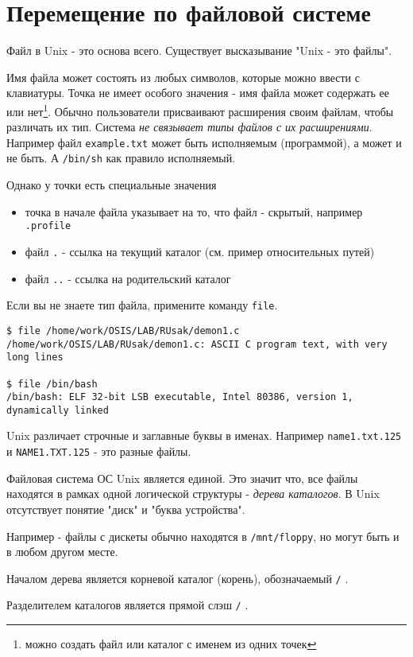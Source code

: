 \section{Перемещение по файловой системе} 


Файл в Unix - это основа всего. Существует высказывание "Unix - это файлы".

Имя файла может состоять из любых символов, которые можно ввести с клавиатуры. Точка не имеет особого значения - имя файла может содержать ее или нет\footnote{можно создать файл или каталог с именем из одних точек}. Обычно пользователи присваивают расширения своим файлам, чтобы различать их тип. Система \emph{не связывает типы файлов с их расширениями}. Например файл \verb+example.txt+ может быть исполняемым (программой), а может и не быть. А \verb+/bin/sh+ как правило исполняемый.

Однако у точки есть специальные значения 
\begin{itemize}
\item точка в начале файла указывает на то, что файл - скрытый, например \verb+.profile+
\item файл \verb+.+ - ссылка на текущий каталог (см. пример относительных путей)
\item файл \verb+..+ - ссылка на родительский каталог
\end{itemize}

Если вы не знаете тип файла, примените команду \verb+file+.
\begin{verbatim}
$ file /home/work/OSIS/LAB/RUsak/demon1.c 
/home/work/OSIS/LAB/RUsak/demon1.c: ASCII C program text, with very long lines

$ file /bin/bash
/bin/bash: ELF 32-bit LSB executable, Intel 80386, version 1, dynamically linked
\end{verbatim}

Unix различает строчные и заглавные буквы в именах. Например \verb+name1.txt.125+ и \verb+NAME1.TXT.125+ - это разные файлы.

Файловая система ОС Unix является единой. Это значит что, все файлы находятся в рамках одной логической структуры - \emph{дерева каталогов}. В Unix отсутствует понятие "диск" и "буква устройства". 

Например - файлы с дискеты обычно находятся в \verb+/mnt/floppy+, но могут быть и в любом другом месте.

Началом дерева является корневой каталог (корень), обозначаемый \verb+/+ . 

Разделителем каталогов является прямой слэш  \verb+/+ .

